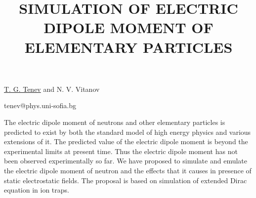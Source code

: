 \title{SIMULATION OF ELECTRIC DIPOLE MOMENT OF ELEMENTARY PARTICLES}

\underline{T. G. Tenev} and N. V. Vitanov

{\normalsize{
\vspace{-4mm}\unisofia

\email tenev@phys.uni-sofia.bg}}

The electric dipole moment of neutrons and other elementary particles is predicted to exist by both the
standard model of high energy physics and various extensions of it. The predicted value of the electric
dipole moment is beyond the experimental limits at present time. Thus the electric dipole moment has
not been observed experimentally so far. We have proposed to simulate and emulate the electric dipole
moment of neutron and the effects that it causes in presence of static electrostatic fields. The
proposal is based on simulation of extended Dirac equation in ion traps.

\vspace{\baselineskip} 